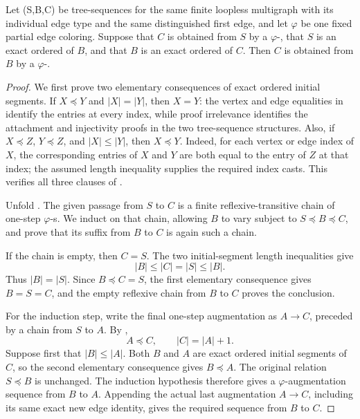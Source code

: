 \begin{lemma}
Let (S,B,C) be tree-sequences for the same finite loopless multigraph
with its individual edge type and the same distinguished first edge, and
let \(\varphi\) be one fixed partial edge coloring.  Suppose that \(C\) is
obtained from \(S\) by a
\(\varphi\)-, that \(S\) is an exact
ordered  of \(B\), and that \(B\) is an
exact ordered  of \(C\).  Then \(C\) is
obtained from \(B\) by a
\(\varphi\)-.
\end{lemma}
\begin{proof}
We first prove two elementary consequences of exact ordered initial
segments.  If \(X\preccurlyeq Y\) and \(|X|=|Y|\), then \(X=Y\): the
vertex and edge equalities in
 identify the entries at every index,
while proof irrelevance identifies the attachment and injectivity proofs
in the two tree-sequence structures.  Also, if
\(X\preccurlyeq Z\), \(Y\preccurlyeq Z\), and \(|X|\leq |Y|\), then
\(X\preccurlyeq Y\).  Indeed, for each vertex or edge index of \(X\), the
corresponding entries of \(X\) and \(Y\) are both equal to the entry of
\(Z\) at that index; the assumed length inequality supplies the required
index casts.  This verifies all three clauses of
.

Unfold .  The given passage from
\(S\) to \(C\) is a finite reflexive-transitive chain of one-step
\(\varphi\)-s.  We induct on that chain,
allowing \(B\) to vary subject to \(S\preccurlyeq B\preccurlyeq C\), and
prove that its suffix from \(B\) to \(C\) is again such a chain.

If the chain is empty, then \(C=S\).  The two initial-segment length
inequalities give
\[
                  |B|\leq |C|=|S|\leq |B|.
\]
Thus \(|B|=|S|\).  Since \(B\preccurlyeq C=S\), the first elementary
consequence gives \(B=S=C\), and the empty reflexive chain from \(B\) to
\(C\) proves the conclusion.

For the induction step, write the final one-step augmentation as
\(A\longrightarrow C\), preceded by a chain from \(S\) to \(A\).  By
,
\[
                       A\preccurlyeq C,
             \qquad |C|=|A|+1.                                \tag{1}
\]
Suppose first that \(|B|\leq |A|\).  Both \(B\) and \(A\) are exact
ordered initial segments of \(C\), so the second elementary consequence
gives \(B\preccurlyeq A\).  The original relation
\(S\preccurlyeq B\) is unchanged.  The induction hypothesis therefore
gives a \(\varphi\)-augmentation sequence from \(B\) to \(A\).  Appending
the actual last augmentation \(A\to C\), including its same exact new
edge identity, gives the required sequence from \(B\) to \(C\).


\end{proof}
